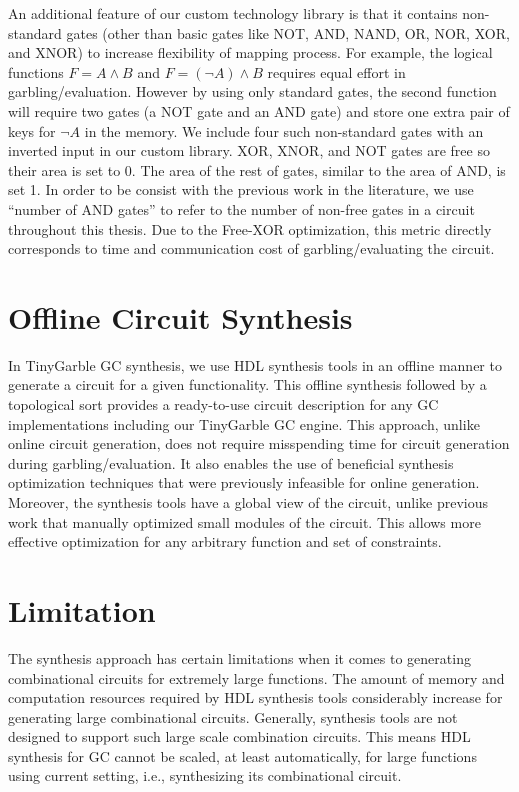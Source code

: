 An additional feature of our custom technology library is that it contains non-standard gates (other than basic gates like NOT, AND, NAND, OR, NOR, XOR, and XNOR) to increase flexibility of mapping process.
For example, the logical functions $F = A\wedge B$ and $F = (\neg A)\wedge B$ requires equal effort in garbling/evaluation.
However by using only standard gates, the second function will require two gates (a NOT gate and an AND gate) and store one extra pair of keys for $\neg A$ in the memory.
We include four such non-standard gates with an inverted input in our custom library.
XOR, XNOR, and NOT gates are free so their area is set to 0.
The area of the rest of gates, similar to the area of AND, is set 1.
In order to be consist with the previous work in the literature, we use ``number of AND gates'' to refer to the number of non-free gates in a circuit throughout this thesis.
Due to the Free-XOR optimization, this metric directly corresponds to time and communication cost of garbling/evaluating the circuit.

\section{Offline Circuit Synthesis}
In TinyGarble GC synthesis, we use HDL synthesis tools in an offline manner to generate a circuit for a given functionality.
This offline synthesis followed by a topological sort provides a ready-to-use circuit description for any GC implementations including our TinyGarble GC engine.
This approach, unlike online circuit generation, does not require misspending time for circuit generation during garbling/evaluation.
It also enables the use of beneficial synthesis optimization techniques that were previously infeasible for online generation.
Moreover, the synthesis tools have a global view of the circuit, unlike previous work that manually optimized small modules of the circuit.
This allows more effective optimization for any arbitrary function and set of constraints.

\section{Limitation}\label{sect:syn-limit}
The synthesis approach has certain limitations when it comes to generating combinational circuits for extremely large functions.
The amount of memory and computation resources required by HDL synthesis tools considerably increase for generating large combinational circuits.
Generally, synthesis tools are not designed to support such large scale combination circuits.
This means HDL synthesis for GC cannot be scaled, at least automatically, for large functions using current setting, i.e., synthesizing its combinational circuit.

